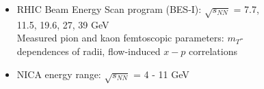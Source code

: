 \documentclass[dvipsnames] {beamer}
\begin{document}
\begin{frame}
{\begin{columns}[t]
\begin{block}{}
                         \begin{itemize}
                         \item {\color{darkblue!70!black} RHIC Beam Energy Scan program (BES-I):} $\sqrt{s_{NN}}$ = 7.7, 11.5, 19.6, 27, 39 GeV \\
                           Measured pion and kaon femtoscopic parameters: $m_{T}$-dependences of radii, flow-induced $x-p$ correlations
                         \item {\color{darkgreen!50!black} NICA energy range:} $\sqrt{s_{NN}}$ = 4 - 11 GeV
                         \end{itemize}
                       \end{block}
                       \begin{block}{\bf {}}
                         \begin{figure}[H]

\end{figure}
\end{block}
\end{columns}}
\end{frame}
\end{document}
